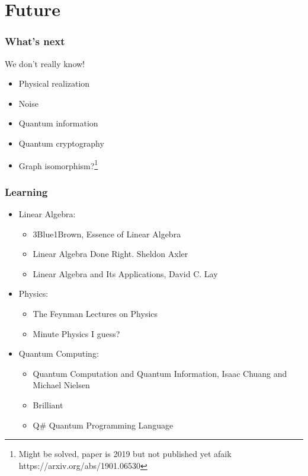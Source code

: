 \documentclass{beamer}
\begin{document}
\section{Future}
\begin{frame}
    \frametitle{What's next}
    We don't really know!
    \begin{itemize}
        \item Physical realization
        \item Noise
        \item Quantum information
        \item Quantum cryptography
        \item Graph isomorphism?\footnote{Might be solved, paper is 2019 but not published yet afaik https://arxiv.org/abs/1901.06530}
    \end{itemize}
\end{frame}
\begin{frame}
    \frametitle{Learning}
    \begin{itemize}
        \item Linear Algebra: \begin{itemize}
                  \item 3Blue1Brown, Essence of Linear Algebra
                  \item Linear Algebra Done Right. Sheldon Axler
                  \item Linear Algebra and Its Applications, David C. Lay
              \end{itemize}
        \item Physics: \begin{itemize}
                  \item  The Feynman Lectures on Physics
                  \item Minute Physics I guess?
              \end{itemize}
        \item Quantum Computing: \begin{itemize}
                  \item Quantum Computation and Quantum Information, Isaac Chuang and Michael Nielsen
                  \item Brilliant
                  \item Q\# Quantum Programming Language
              \end{itemize}
    \end{itemize}
\end{frame}
\end{document}
